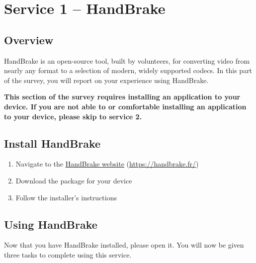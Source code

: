 \section{Service 1 – HandBrake}
\subsection{Overview}
HandBrake is an open-source tool, built by volunteers, for converting video from nearly any format to a selection of modern, widely supported codecs. In this part of the survey, you will report on your experience using HandBrake.



\begin{warningbox}
\textbf{This section of the survey requires installing an application to your device. If you are not able to or comfortable installing an application to your device, please skip to service 2.}
\end{warningbox}

\subsection{Install HandBrake}

\begin{enumerate}
    \item Navigate to the \href{https://handbrake.fr/}{HandBrake website} (\url{https://handbrake.fr/})
    \item Download the package for your device
    \item Follow the installer's instructions
\end{enumerate}

\clearpage


\subsection{Using HandBrake}

Now that you have HandBrake installed, please open it. You will now be given three tasks to complete using this service.
\clearpage

\clearpage

\clearpage

\clearpage

